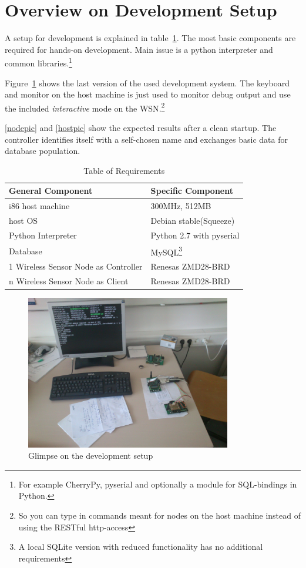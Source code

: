 \section{Overview on Development Setup}

A setup for development is explained in table~\ref{tab:requirements}. The most basic components are 
required for hands-on development. Main issue is a python interpreter and common libraries.\footnote{For example
CherryPy, pyserial and optionally a module for SQL-bindings in Python.}

Figure~\ref{setupic} shows the last version of the used development system. The keyboard and monitor on the host machine
is just used to monitor debug output and use the included \textsl{interactive} mode on the \textsc{WSN}.\footnote{So you can 
type in commands meant for nodes on the host machine instead of using the RESTful http-access}

\ref{nodepic} and \ref{hostpic} show the expected results after a clean startup. The controller identifies itself with a
self-chosen name and exchanges basic data for database population.
 

\begin{table}[h] 
\centering 
\begin{tabular}{|l||l|} 
General Component & Specific Component\\ 
\hline 
i86 host machine & 300MHz, 512MB\\ 
host OS & Debian stable(Squeeze) \\ 
Python Interpreter & Python 2.7 with pyserial \\ 
Database & MySQL\footnote{A local SQLite version with reduced functionality has no additional requirements} \\ 
1 Wireless Sensor Node as Controller & Renesas ZMD28-BRD \\
n Wireless Sensor Node as Client & Renesas ZMD28-BRD \\ 
\end{tabular} 
\caption{ Table of Requirements} 
\label{tab:requirements} 
\end{table}


\begin{figure}[H]
   \centering
   \includegraphics[width=0.8\textwidth]{pic/whole_setup.jpg}%
   \caption{Glimpse on the development setup}
   \label{setupic}%
\end{figure}

